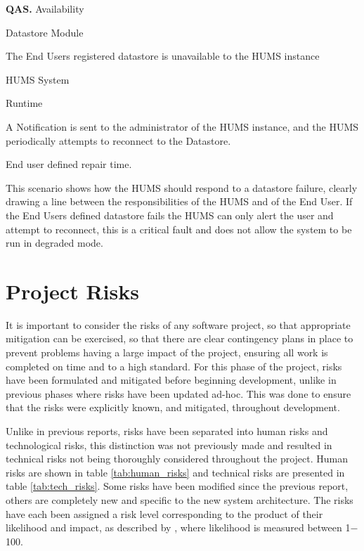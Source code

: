 \documentclass[10pt,a4paper]{article}
\newcommand{\qas}[1]{\textcolor{reqColor}{\textbf{QAS.#1}}}
\newenvironment{scenario}[1]{
\newcommand{\source}[1]{\item[Source of Stimulus:] ##1}
\newcommand{\stimulus}[1]{\item[Stimulus:] ##1}
\newcommand{\artifact}[1]{\item[Artifact:] ##1}
\newcommand{\environment}[1]{\item[Environment:] ##1}
\newcommand{\response}[1]{\item[Response:] ##1}
\newcommand{\measure}[1]{\item[Response Measure:] ##1}
\newcommand{\rationale}[1]{\item[Scenario Rationale:] ##1}
\newcommand{\quality}[1]{\item[Quality:] ##1}
		\begin{description} [noitemsep]	
		\item[Scenario ID:] \qas{#1}
		}{\end{description} \vspace*{0.3cm}
		}
\begin{document}
\begin{scenario}{4}
\quality{Availability}
\source{Datastore Module}
\stimulus{The End Users registered datastore is unavailable to the HUMS instance}
\artifact{HUMS System}
\environment{Runtime}
\response{A Notification is sent to the administrator of the HUMS instance, and the HUMS periodically attempts to reconnect to the Datastore.}
\measure{End user defined repair time.}
\rationale{This scenario shows how the HUMS should respond to a datastore failure, clearly drawing a line between the responsibilities of the HUMS and of the End User. If the End Users defined datastore fails the HUMS can only alert the user and attempt to reconnect, this is a critical fault and does not allow the system to be run in degraded mode.}
\end{scenario}

\section{Project Risks}
\label{sec:risks}
It is important to consider the risks of any software project, so that appropriate mitigation can be exercised, so that there are clear contingency plans in place to prevent problems having a large impact of the project, ensuring all work is completed on time and to a high standard. For this phase of the project, risks have been formulated and mitigated before beginning development, unlike in previous phases where risks have been updated ad-hoc. This was done to ensure that the risks were explicitly known, and mitigated, throughout development. 

Unlike in previous reports, risks have been separated into human risks and technological risks, this distinction was not previously made and resulted in technical risks not being thoroughly considered throughout the project. Human risks are shown in table \ref{tab:human_risks} and technical risks are presented in table \ref{tab:tech_risks}.
Some risks have been modified since the previous report, others are completely new and specific to the new system architecture. The risks have each been assigned a risk level corresponding to the product of their likelihood and impact, as described by \cite{risks}, where likelihood is measured between 1$-$100.
\end{document}
